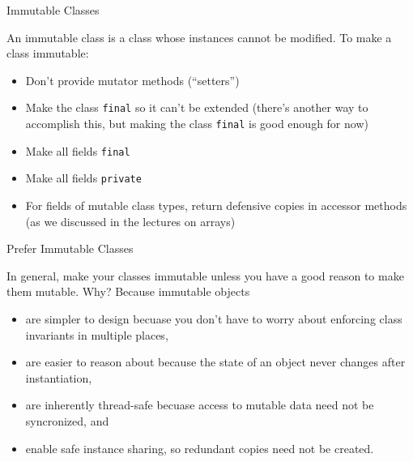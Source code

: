 \documentclass{beamer}
\begin{document}
\begin{frame}[fragile]{Immutable Classes}


An immutable class is a class whose instances cannot be modified.  To make a class immutable:

\begin{itemize}
\item Don't provide mutator methods (``setters'')
\item Make the class {\tt final} so it can't be extended (there's another way to accomplish this, but making the class {\tt final} is good enough for now)
\item Make all fields {\tt final}
\item Make all fields {\tt private}
\item For fields of mutable class types, return defensive copies in accessor methods (as we discussed in the lectures on arrays)
\end{itemize}

\end{frame}

\begin{frame}[fragile]{Prefer Immutable Classes}


In general, make your classes immutable unless you have a good reason to make them mutable.  Why?  Because immutable objects
\begin{itemize}
\item are simpler to design becuase you don't have to worry about enforcing class invariants in multiple places,
\item are easier to reason about because the state of an object never changes after instantiation,
\item are inherently thread-safe becuase access to mutable data need not be syncronized, and
\item enable safe instance sharing, so redundant copies need not be created.
\end{itemize}

\end{frame}
\end{document}
